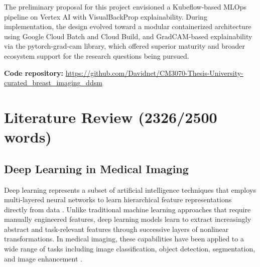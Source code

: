 \documentclass[justified,notoc,openany]{tufte-book}
\begin{document}
The preliminary proposal for this project envisioned a Kubeflow-based MLOps pipeline on Vertex AI with VisualBackProp explainability. During implementation, the design evolved toward a modular containerized architecture using Google Cloud Batch and Cloud Build, and GradCAM-based explainability via the pytorch-grad-cam library, which offered superior maturity and broader ecosystem support for the research questions being pursued.

\textbf{Code repository:} \url{https://github.com/Davidnet/CM3070-Thesis-University-curated_breast_imaging_ddsm}

\newpage

\chapter{Literature Review (2326/2500 words)}\label{literature-review-23262500-words}

\section{Deep Learning in Medical Imaging}\label{deep-learning-in-medical-imaging}

Deep learning represents a subset of artificial intelligence techniques that employs multi-layered neural networks to learn hierarchical feature representations directly from data \cite{LeCun1998}. Unlike traditional machine learning approaches that require manually engineered features, deep learning models learn to extract increasingly abstract and task-relevant features through successive layers of nonlinear transformations. In medical imaging, these capabilities have been applied to a wide range of tasks including image classification, object detection, segmentation, and image enhancement \cite{Carriero2024}.
\end{document}
